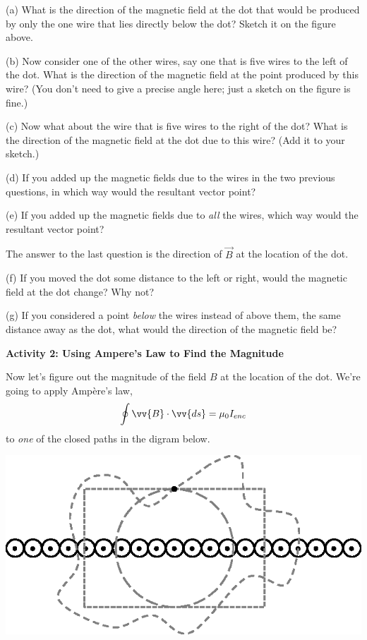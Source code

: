 (a) What is the direction of the magnetic
field at the dot that would be produced by only the one wire that lies directly below
the dot?  Sketch it on the figure above.

(b) Now consider one of the other wires,
say one that is five wires to the left of the dot.
What is the direction of the magnetic field at the point produced by this 
wire? (You don't need to give a precise angle here; just a sketch on the figure is fine.)

(c) Now what about the wire that is five wires to the right of the dot?
What is the direction of the magnetic field at the dot due to this wire?  (Add it to your sketch.)

(d) If you added up the magnetic fields due to the wires in the two
previous questions, in which way would the resultant vector point?
\answerspace{0.5in}

(e) If you added up the magnetic fields due to \textit{all} the wires,
which way would the resultant vector point?
\answerspace{0.5in}

The answer to the last question is the direction of $\vec B$ at 
the location of the dot.

(f) If you moved the dot some distance to the left or right,
would the magnetic field at the dot change? Why not?
\answerspace{0.5in}

(g) If you considered a point \textit{below} the wires instead of
above them, the same distance away as the dot, what would the
direction of the magnetic field be?
\answerspace{0.5in}

\textbf{Activity 2: Using Ampere's Law to Find the Magnitude}

Now let's figure out the magnitude of the field $B$ at the location of the dot.
We're going to apply Amp\`ere's law,
\begin{equation*}
\oint \vv{B}\cdot \vv{ds} = \mu_0 I_{enc}
\end{equation*}
to \textit{one} of the closed paths in the digram below.

\centerline{\includegraphics{amperes_law_infinite_sheet/wires_with_dot_and_paths.eps}}

